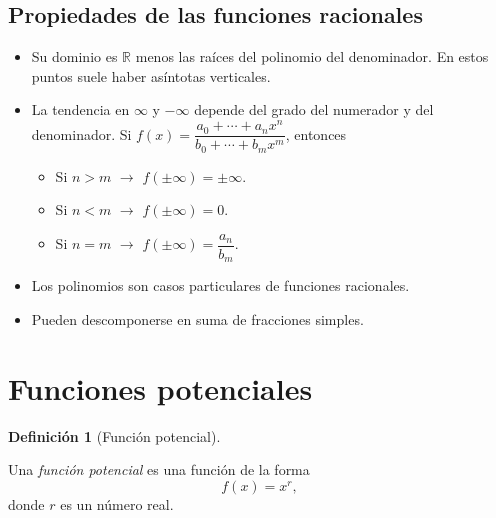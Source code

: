 \documentclass[
  a4paper,
]{scrreport}
\providecommand{\tightlist}{%
  \setlength{\itemsep}{0pt}\setlength{\parskip}{0pt}}\usepackage{longtable,booktabs,array}
\theoremstyle{definition}
\theoremstyle{plain}
\theoremstyle{definition}
\newtheorem{definition}{Definición}[chapter]
\theoremstyle{definition}
\theoremstyle{plain}
\theoremstyle{plain}
\theoremstyle{remark}
\begin{document}
\subsection{Propiedades de las funciones
racionales}\label{propiedades-de-las-funciones-racionales}

\begin{itemize}
\tightlist
\item
  Su dominio es \(\mathbb{R}\) menos las raíces del polinomio del
  denominador. En estos puntos suele haber asíntotas verticales.
\item
  La tendencia en \(\infty\) y \(-\infty\) depende del grado del
  numerador y del denominador. Si
  \(f(x)=\dfrac{a_0+\cdots +a_nx^n}{b_0+\cdots+b_mx^m}\), entonces

  \begin{itemize}
  \tightlist
  \item
    Si \(n>m\) \(\rightarrow\) \(f(\pm\infty)=\pm\infty\).
  \item
    Si \(n<m\) \(\rightarrow\) \(f(\pm\infty)=0\).
  \item
    Si \(n=m\) \(\rightarrow\) \(f(\pm\infty)=\dfrac{a_n}{b_m}\).
  \end{itemize}
\item
  Los polinomios son casos particulares de funciones racionales.
\item
  Pueden descomponerse en suma de fracciones simples.
\end{itemize}

\section{Funciones potenciales}\label{funciones-potenciales}

\begin{definition}[Función
potencial]\protect\hypertarget{def-funcion-potencial}{}\label{def-funcion-potencial}

Una \emph{función potencial} es una función de la forma \[f(x)=x^r,\]
donde \(r\) es un número real.

\end{definition}
\end{document}
